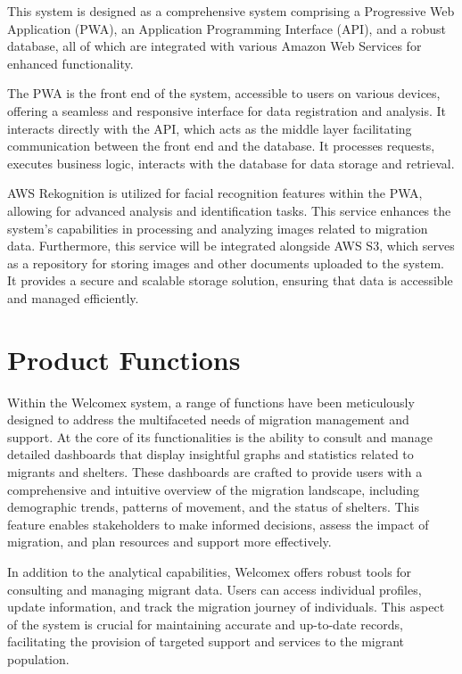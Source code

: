 \documentclass{scrreprt}
\begin{document}
This system is designed as a comprehensive system comprising a Progressive Web Application (PWA), an Application Programming Interface (API), and a robust database, all of which are integrated with various Amazon Web Services for enhanced functionality.

The PWA is the front end of the system, accessible to users on various devices, offering a seamless and responsive interface for data registration and analysis. It interacts directly with the API, which acts as the middle layer facilitating communication between the front end and the database. It processes requests, executes business logic, interacts with the database for data storage and retrieval.

AWS Rekognition is utilized for facial recognition features within the PWA, allowing for advanced analysis and identification tasks. This service enhances the system's capabilities in processing and analyzing images related to migration data. Furthermore, this service will be integrated alongside AWS S3, which serves as a repository for storing images and other documents uploaded to the system. It provides a secure and scalable storage solution, ensuring that data is accessible and managed efficiently.

\section{Product Functions}
Within the Welcomex system, a range of functions have been meticulously designed to address the multifaceted needs of migration management and support. At the core of its functionalities is the ability to consult and manage detailed dashboards that display insightful graphs and statistics related to migrants and shelters. These dashboards are crafted to provide users with a comprehensive and intuitive overview of the migration landscape, including demographic trends, patterns of movement, and the status of shelters. This feature enables stakeholders to make informed decisions, assess the impact of migration, and plan resources and support more effectively.

In addition to the analytical capabilities, Welcomex offers robust tools for consulting and managing migrant data. Users can access individual profiles, update information, and track the migration journey of individuals. This aspect of the system is crucial for maintaining accurate and up-to-date records, facilitating the provision of targeted support and services to the migrant population.
\end{document}
